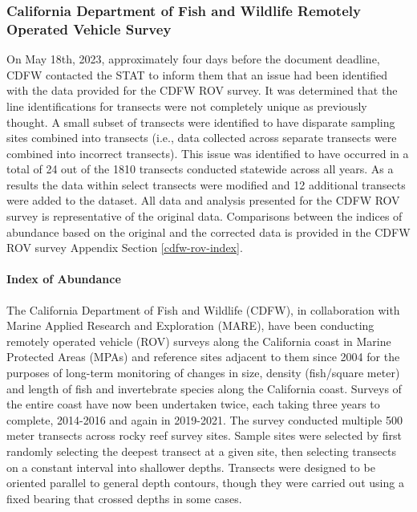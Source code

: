 \documentclass[11pt,
  english,
  letterpaper,
]{article}
\begin{document}
\hypertarget{california-department-of-fish-and-wildlife-remotely-operated-vehicle-survey}{%
\subsubsection{California Department of Fish and Wildlife Remotely Operated Vehicle Survey}\label{california-department-of-fish-and-wildlife-remotely-operated-vehicle-survey}}

On May 18th, 2023, approximately four days before the document deadline, CDFW contacted the STAT to inform them that an issue had been identified with the data provided for the CDFW ROV survey. It was determined that the line identifications for transects were not completely unique as previously thought. A small subset of transects were identified to have disparate sampling sites combined into transects (i.e., data collected across separate transects were combined into incorrect transects). This issue was identified to have occurred in a total of 24 out of the 1810 transects conducted statewide across all years. As a results the data within select transects were modified and 12 additional transects were added to the dataset. All data and analysis presented for the CDFW ROV survey is representative of the original data. Comparisons between the indices of abundance based on the original and the corrected data is provided in the CDFW ROV survey Appendix Section \ref{cdfw-rov-index}.

\hypertarget{index-of-abundance-1}{%
\paragraph{Index of Abundance}\label{index-of-abundance-1}}

\hfill\break

The California Department of Fish and Wildlife (CDFW), in collaboration with Marine Applied Research and Exploration (MARE), have been conducting remotely operated vehicle (ROV) surveys along the California coast in Marine Protected Areas (MPAs) and reference sites adjacent to them since 2004 for the purposes of long-term monitoring of changes in size, density (fish/square meter) and length of fish and invertebrate species along the California coast. Surveys of the entire coast have now been undertaken twice, each taking three years to complete, 2014-2016 and again in 2019-2021. The survey conducted multiple 500 meter transects across rocky reef survey sites. Sample sites were selected by first randomly selecting the deepest transect at a given site, then selecting transects on a constant interval into shallower depths. Transects were designed to be oriented parallel to general depth contours, though they were carried out using a fixed bearing that crossed depths in some cases.
\end{document}
